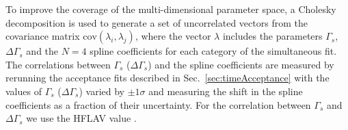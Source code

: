To improve the coverage of the multi-dimensional parameter space, a Cholesky decomposition \cite{Golub:1996:MC:248979} is used to generate a set of uncorrelated vectors from the covariance matrix $\text{cov}(\lambda_i,\lambda_j)$, where the vector $\lambda$ includes the parameters $\Gamma_s$, $\Delta\Gamma_s$ and the $N=4$ spline coefficients for each category of the simultaneous fit.
The correlations between $\Gamma_s$ ($\Delta\Gamma_s$) and the spline coefficients are measured by rerunning the acceptance fits described in Sec.~\ref{sec:timeAcceptance} 
with the values of $\Gamma_s$ ($\Delta\Gamma_s$) varied by $\pm 1\sigma$ and measuring the shift in the spline coefficients as a fraction of
their uncertainty. 
For the correlation between $\Gamma_s$ and $\Delta\Gamma_s$ we use the HFLAV value \cite{HFAG}.

%
